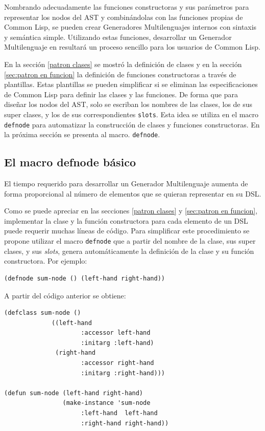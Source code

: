 Nombrando adecuadamente las funciones constructoras y sus parámetros para representar los nodos del AST y combinándolas con las funciones propias de Common Lisp, se pueden crear Generadores Multilenguajes internos con sintaxis y semántica simple. Utilizando estas funciones, desarrollar un Generador Multilenguaje en {\gagm} resultará un proceso sencillo para los usuarios de Common Lisp.

En la sección \ref{patron clases}  se mostró la definición de clases y en la sección \ref{sec:patron en funcion} la definición de funciones constructoras a través de plantillas. Estas plantillas se pueden simplificar si se eliminan las especificaciones de Common Lisp para definir las clases y las funciones. De forma que para diseñar los nodos del AST, solo se escriban los nombres de las clases, los de sus super clases, y los de sus correspondientes \texttt{slots}. Esta idea se utiliza en el macro \texttt{defnode} para automatizar la construcción de clases y funciones constructoras. En la próxima sección se presenta al macro. \texttt{defnode}.   

\subsection{El macro defnode básico}	
\label{defnodebasico}
El tiempo requerido para desarrollar un Generador Multilenguaje aumenta de forma proporcional al número de elementos que se quieran representar en su DSL. 

Como se puede apreciar en las secciones \ref{patron clases} y \ref{sec:patron en funcion}, implementar la clase y la función constructora para cada elemento de un DSL puede requerir muchas líneas de código. Para simplificar este procedimiento se propone utilizar el macro \texttt{defnode} que a partir del nombre de la clase, sus super clases, y sus \textit{slots}, genera automáticamente la definición de la clase y su función constructora. Por ejemplo: 

\begin{verbatim}
(defnode sum-node () (left-hand right-hand))
\end{verbatim}

A partir del código anterior se obtiene:\\ 

\begin{verbatim}
(defclass sum-node ()
             ((left-hand 
                     :accessor left-hand 
                     :initarg :left-hand)
              (right-hand 
                     :accessor right-hand 
                     :initarg :right-hand)))
					 
(defun sum-node (left-hand right-hand)
                (make-instance 'sum-node 
                     :left-hand  left-hand
                     :right-hand right-hand))								 
\end{verbatim}

